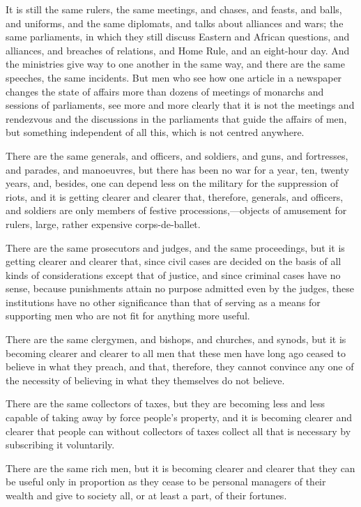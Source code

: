 \documentclass{book}
\begin{document}
It is still the same rulers, the same meetings, and chases, and feasts, and balls, and uniforms, and the same diplomats, and talks about alliances and wars; the same parliaments, in which they still discuss Eastern and African questions, and alliances, and breaches of relations, and Home Rule, and an eight-hour day. And the ministries give way to one another in the same way, and there are the same speeches, the same incidents. But men who see how one article in a newspaper changes the state of affairs more than dozens of meetings of monarchs and sessions of parliaments, see more and more clearly that it is not the meetings and rendezvous and the discussions in the parliaments that guide the affairs of men, but something independent of all this, which is not centred anywhere.

There are the same generals, and officers, and soldiers, and guns, and fortresses, and parades, and manoeuvres, but there has been no war for a year, ten, twenty years, and, besides, one can depend less on the military for the suppression of riots, and it is getting clearer and clearer that, therefore, generals, and officers, and soldiers are only members of festive processions,—objects of amusement for rulers, large, rather expensive corps-de-ballet.

There are the same prosecutors and judges, and the same proceedings, but it is getting clearer and clearer that, since civil cases are decided on the basis of all kinds of considerations except that of justice, and since criminal cases have no sense, because punishments attain no purpose admitted even by the judges, these institutions have no other significance than that of serving as a means for supporting men who are not fit for anything more useful.

There are the same clergymen, and bishops, and churches, and synods, but it is becoming clearer and clearer to all men that these men have long ago ceased to believe in what they preach, and that, therefore, they cannot convince any one of the necessity of believing in what they themselves do not believe.

There are the same collectors of taxes, but they are becoming less and less capable of taking away by force people’s property, and it is becoming clearer and clearer that people can without collectors of taxes collect all that is necessary by subscribing it voluntarily.

There are the same rich men, but it is becoming clearer and clearer that they can be useful only in proportion as they cease to be personal managers of their wealth and give to society all, or at least a part, of their fortunes.
\end{document}
